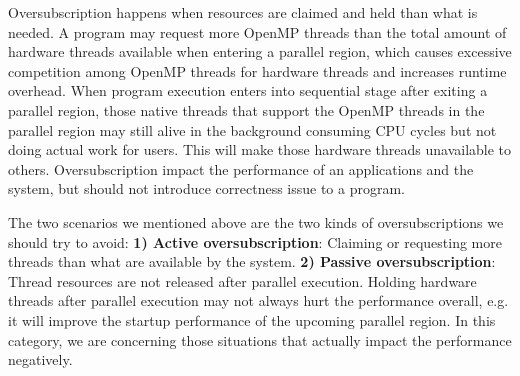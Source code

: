 Oversubscription happens when resources are claimed and held than what is needed.
A program may request more OpenMP threads than the total amount of hardware
threads available when entering a parallel region, which causes excessive competition 
among OpenMP threads for hardware threads and increases runtime overhead. 
When program execution enters into sequential stage after exiting a parallel region, 
those native threads that support the OpenMP threads in the parallel region may still 
alive in the background consuming CPU cycles but not doing actual work for users. This 
will make those hardware threads unavailable to others. 
Oversubscription impact the performance of an applications and the system, 
but should not introduce correctness issue to a program. 


The two scenarios we mentioned above are the two kinds of oversubscriptions we should try to avoid:
{\bf 1) Active oversubscription}: Claiming or requesting more threads than 
what are available by the system.
{\bf 2) Passive oversubscription}: Thread resources are not released 
after parallel execution. Holding hardware threads after parallel execution may not 
always hurt the performance overall, e.g. it will improve the startup performance of the 
upcoming parallel region. In this category, we are concerning those situations that 
actually impact the performance negatively.

